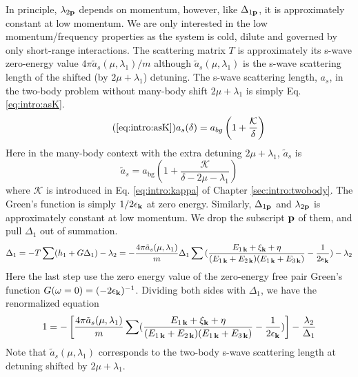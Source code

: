In principle, $\lambda_{2\mathbf{p}}$ depends on momentum, however, like $\Delta_{1\mathbf{p}}$, it is approximately constant at low momentum.
We are only interested in the low momentum/frequency properties as the system is cold, dilute and governed by only short-range interactions. The scattering matrix $T$ is approximately its s-wave zero-energy value ${4\pi{\tilde{a}_{s}(\mu,\lambda_{1})}}/{m}$ although $\tilde{a}_{s}(\mu,\lambda_{1})$ is the s-wave scattering length of the shifted (by $2\mu+\lambda_{1}$) detuning. The s-wave scattering length, $a_s$, in the two-body problem without many-body shift $2\mu+\lambda_{1}$ is simply Eq. \ref{eq:intro:asK}.  
\begin{equation}\tag{\ref{eq:intro:asK}}
a_{s}(\delta)=a_{bg}\br{1+\frac{\mathcal{K}}{\delta}}
\end{equation}
Here in the many-body context with the extra detuning $2\mu+\lambda_{1}$, $\tilde{a}_{s}$ is 
\begin{equation}\label{eq:pathInt2:asKshift}
\tilde{a}_{s}=a_{\text{bg}}(1+\frac{\mathcal{K}}{\delta-2\mu-\lambda_{1}})
\end{equation}
where $\mathcal{K}$ is introduced in Eq. \ref{eq:intro:kappa} of Chapter \ref{sec:intro:twobody}. 
The Green's function is simply $1/2\epsilon_{\mathbf{k}}$ at zero energy.   Similarly,   $\Delta_{1\mathbf{p}}$ and $\lambda_{2\mathbf{p}}$ is approximately  constant at low momentum.  We drop the subscript $\mathbf{p}$ of them, and pull $\Delta_{1}$ out of summation. 
\begin{equation}
\Delta_{1}=-T\sum(h_{1}+G\Delta_{1})-\lambda_{2}
=-\frac{4\pi{\tilde{a}_{s}(\mu,\lambda_{1})}}{m}\Delta_{1}\sum{}(\frac{E_{1\,\mathbf{k}}+\xi_{\mathbf{k}}+\eta}{(E_{1\,\mathbf{k}}+E_{2\,\mathbf{k}})(E_{1\,\mathbf{k}}+E_{3\,\mathbf{k}})}-\frac{1}{2\epsilon_{\mathbf{k}}})
	-\lambda_{2}
\end{equation}
Here the last step use the zero energy value of the zero-energy free pair Green's function $G(\omega=0)=(-2\epsilon_{\mathbf{k}})^{-1}$. Dividing both sides with $\Delta_{1}$, we have the renormalized equation
\begin{equation}
1=-\left[\frac{4\pi{\tilde{a}_{s}(\mu,\lambda_{1})}}{m}\sum(\frac{E_{1\,\mathbf{k}}+\xi_{\mathbf{k}}+\eta}{(E_{1\,\mathbf{k}}+E_{2\,\mathbf{k}})(E_{1\,\mathbf{k}}+E_{3\,\mathbf{k}})}-\frac{1}{2\epsilon_{\mathbf{k}}})\right]
	-\frac{\lambda_{2}}{\Delta_{1}}
\end{equation}
Note that $\tilde{a}_{s}(\mu,\lambda_{1})$ corresponds to the two-body s-wave scattering length at detuning shifted by $2\mu+\lambda_{1}$.


